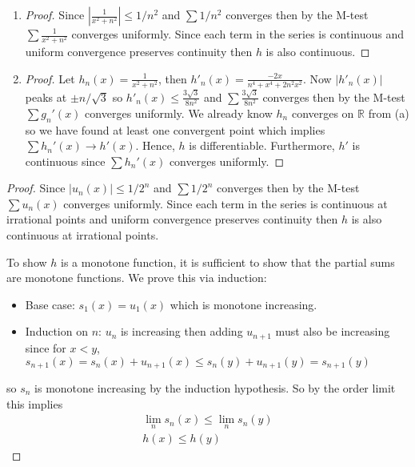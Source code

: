 \begin{enumerate}[label=(\alph*)]
    \item 
    \begin{proof}
        Since $|\frac{1}{x^2+n^2}|\leq 1/n^2$ and $\sum  1/n^2$
        converges then by the M-test $\sum \frac{1}{x^2+n^2}$ converges 
        uniformly. Since each term in the series is continuous and 
        uniform convergence preserves continuity then $h$ is also 
        continuous.
    \end{proof}

    \item
    \begin{proof}
        Let $h_n(x) = \frac{1}{x^2+n^2}$, then $h'_n(x) =\frac{-2x}{n^4+x^4+2n^2x^2}$.
        Now $|h'_n(x)|$ peaks at $\pm n/ \sqrt 3$ so $h'_n(x)\leq \frac{3\sqrt 3}{8n^2}$
         and $\sum \frac{3\sqrt 3}{8n^2}$
        converges then by the M-test $\sum g_n'(x)$ converges 
        uniformly. We already know $h_n$ converges on $\mathbb{R}$ from (a)
        so we have found at least one convergent point which implies
        $\sum h_n'(x) \rightarrow h'(x)$. Hence, $h$ is differentiable.
        Furthermore, $h'$ is continuous since $\sum h_n'(x)$ converges 
        uniformly.
    \end{proof}
\end{enumerate}

\begin{proof}
    Since $|u_n(x)|\leq 1/2^n$ and $\sum  1/2^n$
    converges then by the M-test $\sum u_n(x)$ converges 
    uniformly. Since each term in the series is continuous at irrational points
     and uniform convergence preserves continuity then $h$ is also 
    continuous at irrational points.

    To show $h$ is a monotone function, 
    it is sufficient to show that the partial sums are monotone functions.
    We prove this via induction:
    \begin{itemize}
        \item Base case: $s_1(x) = u_1(x)$ which is monotone increasing.
        \item Induction on $n$: $u_n$ is increasing then adding $u_{n+1}$ must 
        also be increasing since for $x<y$, $s_{n+1}(x) = s_{n}(x)+u_{n+1}(x) 
        \leq s_{n}(y)+u_{n+1}(y) = s_{n+1}(y)$
    \end{itemize}
    so $s_n$ is monotone increasing by the induction hypothesis.
    So by the order limit \Thm this implies 
    \begin{gather*}
        \lim_n s_n(x) \leq \lim_n s_n(y) \\
        h(x) \leq h(y)
    \end{gather*}
\end{proof}